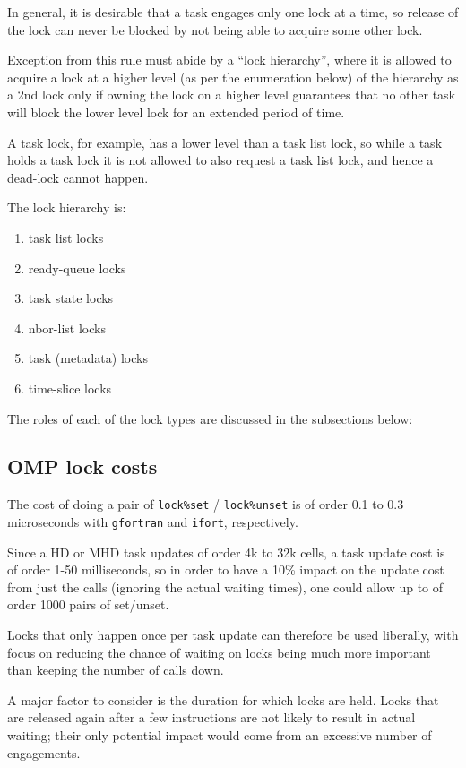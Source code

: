 \documentclass[paper=a4,fontsize=11pt]{scrartcl}
\numberwithin{equation}{section}		%
\numberwithin{figure}{section}			%
\numberwithin{table}{section}				%
\newcommand{\codecolor}{\color{Blue}}
\newcommand{\cmdcolor}{\color{ForestGreen}}
\newcommand{\Code}[1]{{\codecolor\texttt{#1}}}
\newcommand{\Cmd}[1]{{\cmdcolor\texttt{#1}}}
\begin{document}
In general, it is desirable that a task engages only one lock at a time, so release of the lock can never be blocked by not being able to acquire some other lock.

Exception from this rule must abide by a ``lock hierarchy'', where it is allowed to acquire a lock at a higher level (as per the enumeration below) of the hierarchy as a 2nd lock only if owning the lock on a higher level guarantees that no other task will block the lower level lock for an extended period of time.

A task lock, for example, has a lower level than a task list lock, so while a task holds a task lock it is not allowed to also request a task list lock, and hence a dead-lock cannot happen.

The lock hierarchy is:
\begin{enumerate}
    \item task list locks
    \item ready-queue locks
    \item task state locks
    \item nbor-list locks
    \item task (metadata) locks
    \item time-slice locks
\end{enumerate}
The roles of each of the lock types are discussed in the subsections below:

\subsection {OMP lock costs}
The cost of doing a pair of \Code{lock\%set} /  \Code{lock\%unset} is of order 0.1 to 0.3 microseconds with \Cmd{gfortran} and \Cmd{ifort}, respectively.

Since a HD or MHD task updates of order 4k to 32k cells, a task update cost is of order 1-50 milliseconds, so in order to have a 10\% impact on the update cost from just the calls (ignoring the actual waiting times), one could allow up to of order 1000 pairs of set/unset.

Locks that only happen once per task update can therefore be used liberally, with focus on reducing the chance of waiting on locks being much more important than keeping the number of calls down.

A major factor to consider is the duration for which locks are held.  Locks that are released again after a few instructions are not likely to result in actual waiting; their only potential impact would come from an excessive number of engagements.  
\end{document}
